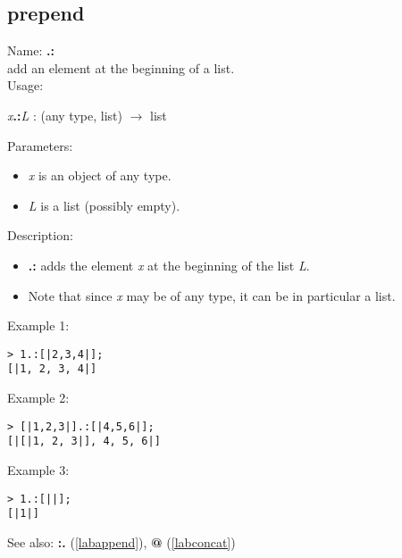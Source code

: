 \subsection{prepend}
\label{labprepend}
\noindent Name: \textbf{.:}\\
add an element at the beginning of a list.\\
\noindent Usage: 
\begin{center}
\emph{x}\textbf{.:}\emph{L} : (\textsf{any type}, \textsf{list}) $\rightarrow$ \textsf{list}
\\ 
\end{center}
Parameters: 
\begin{itemize}
\item \emph{x} is an object of any type.
\item \emph{L} is a list (possibly empty).
\end{itemize}
\noindent Description: \begin{itemize}

\item \textbf{.:} adds the element \emph{x} at the beginning of the list \emph{L}.

\item Note that since \emph{x} may be of any type, it can be in particular a list.
\end{itemize}
\noindent Example 1: 
\begin{center}\begin{minipage}{15cm}\begin{Verbatim}[frame=single]
> 1.:[|2,3,4|];
[|1, 2, 3, 4|]
\end{Verbatim}
\end{minipage}\end{center}
\noindent Example 2: 
\begin{center}\begin{minipage}{15cm}\begin{Verbatim}[frame=single]
> [|1,2,3|].:[|4,5,6|];
[|[|1, 2, 3|], 4, 5, 6|]
\end{Verbatim}
\end{minipage}\end{center}
\noindent Example 3: 
\begin{center}\begin{minipage}{15cm}\begin{Verbatim}[frame=single]
> 1.:[||];
[|1|]
\end{Verbatim}
\end{minipage}\end{center}
See also: \textbf{:.} (\ref{labappend}), \textbf{@} (\ref{labconcat})
